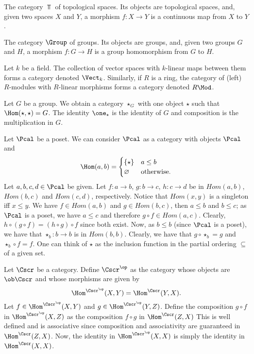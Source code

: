 \begin{example}
  The category $\Top$ of topological spaces.
  Its objects are topological spaces, and, given two spaces $X$ and $Y$, a morphism $f : X \to Y$ is a continuous map from $X$ to $Y$.
\end{example}

\begin{example}
  The category $\Group$ of groups.
  Its objects are groups, and, given two groups $G$ and $H$, a morphism $f : G \to H$ is a group homomorphism from $G$ to $H$.
\end{example}

\begin{example}
  Let $k$ be a field.
  The collection of vector spaces with $k$-linear maps between them forms a category denoted $\Vect_{k}$.
  Similarly, if $R$ is a ring, the category of (left) $R$-modules with $R$-linear morphisms forms a category denoted $R\Mod$.
\end{example}

\begin{example}
  Let $G$ be a group.
  We obtain a category $\star_{G}$ with one object $\star$ such that $\Hom(\star,\star) = G$.
  The identity $\one_{\star}$ is the identity of $G$ and composition is the multiplication in $G$.
\end{example}

\begin{example}
  Let $\Pcal$ be a poset.
  We can consider $\Pcal$ as a category with objects $\Pcal$ and
  \[ \Hom(a,b) = \begin{cases}
      \{\star\} & a \le b \\
      \varnothing & \text{otherwise}.
    \end{cases}\]
  Let $a,b,c,d\in \Pcal$ be given. 
  Let $f:a\to b$, $g:b\to c$, $h:c\to d$ be in $Hom(a,b)$, $Hom(b,c)$ and $Hom(c,d)$, respectively.
  Notice that $Hom(x,y)$ is a singleton iff $x\le y$. 
  We have $f \in Hom(a,b)$ and $g\in Hom(b,c)$, then $a\le b$ and $b\le c$; as $\Pcal$ is a poset, we have $a\le c$ and therefore $g\circ f\in Hom(a,c)$. 
  Clearly, $h\circ(g\circ f)=(h\circ g)\circ f$ since both exist.
  Now, as $b\le b$ (since $\Pcal$ is a poset), we have that $\star_b:b\to b$ is in $Hom(b,b)$. Clearly, we have that $g\circ \star_b=g$ and $\star_b\circ f=f$.
  One can think of $\star$ as the inclusion function in the partial ordering $\subseteq$ of a given set.
\end{example}

\begin{example}
  Let $\Cscr$ be a category.
  Define $\Cscr^{\op}$ as the category whose objects are $\ob \Cscr$ and whose morphisms are given by
  \[ \Hom^{\Cscr^{\op}}(X,Y) = \Hom^{\Cscr}(Y,X). \]
  Let $f\in \Hom^{\Cscr^{\op}}(X,Y)$ and $g\in \Hom^{\Cscr^{\op}}(Y,Z)$. 
  Define the composition $g\circ f$ in $\Hom^{\Cscr^{\op}}(X,Z)$ as the composition $f\circ g$ in $\Hom^{\Cscr}(Z,X)$
  This is well defined and is associative since composition and associativity are guaranteed in $\Hom^{\Cscr}(Z,X)$.
  Now, the identity in $\Hom^{\Cscr^{\op}}(X,X)$ is simply the identity in $\Hom^{\Cscr}(X,X)$.
\end{example}

